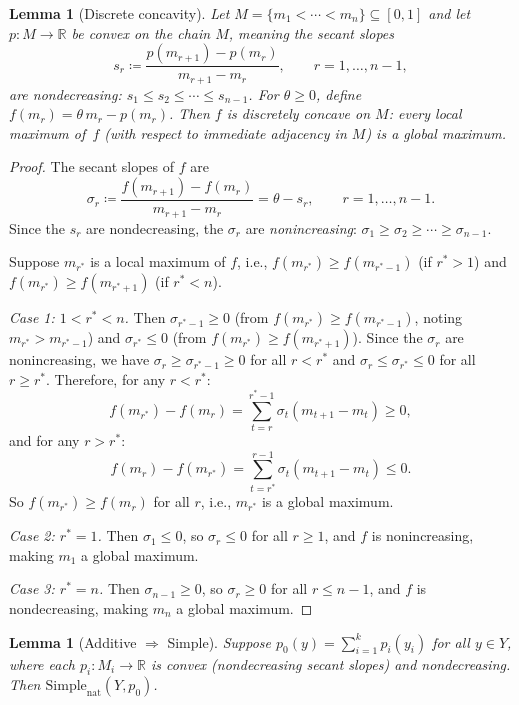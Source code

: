 \documentclass[11pt]{article}
\newtheorem{lemma}[theorem]{Lemma}
\newcommand{\R}{\mathbb{R}}
\newcommand{\Simplenat}{\mathrm{Simple}_{\mathrm{nat}}}
\begin{document}
\begin{lemma}[Discrete concavity]\label{lem:concavity}
Let $M = \{m_1 < \cdots < m_n\} \subseteq [0,1]$ and let $p\colon M \to \R$
be \emph{convex on the chain} $M$, meaning the secant slopes
\[
  s_r \coloneqq \frac{p(m_{r+1}) - p(m_r)}{m_{r+1} - m_r}, \qquad r = 1,\dots,n-1,
\]
are nondecreasing: $s_1 \leq s_2 \leq \cdots \leq s_{n-1}$.
For $\theta \geq 0$, define $f(m_r) = \theta\, m_r - p(m_r)$.
Then $f$ is \emph{discretely concave} on $M$: every local maximum of~$f$
(with respect to immediate adjacency in $M$) is a global maximum.
\end{lemma}

\begin{proof}
The secant slopes of $f$ are
\[
  \sigma_r \coloneqq \frac{f(m_{r+1}) - f(m_r)}{m_{r+1} - m_r} = \theta - s_r,
  \qquad r = 1,\dots,n-1.
\]
Since the $s_r$ are nondecreasing, the $\sigma_r$ are \emph{nonincreasing}:
$\sigma_1 \geq \sigma_2 \geq \cdots \geq \sigma_{n-1}$.

Suppose $m_{r^*}$ is a local maximum of $f$, i.e.,
$f(m_{r^*}) \geq f(m_{r^*-1})$ (if $r^* > 1$) and
$f(m_{r^*}) \geq f(m_{r^*+1})$ (if $r^* < n$).

\emph{Case 1: $1 < r^* < n$.}
Then $\sigma_{r^*-1} \geq 0$ (from $f(m_{r^*}) \geq f(m_{r^*-1})$, noting $m_{r^*} > m_{r^*-1}$)
and $\sigma_{r^*} \leq 0$ (from $f(m_{r^*}) \geq f(m_{r^*+1})$).
Since the $\sigma_r$ are nonincreasing, we have
$\sigma_r \geq \sigma_{r^*-1} \geq 0$ for all $r < r^*$
and $\sigma_r \leq \sigma_{r^*} \leq 0$ for all $r \geq r^*$.
Therefore, for any $r < r^*$:
\[
  f(m_{r^*}) - f(m_r) = \sum_{t=r}^{r^*-1} \sigma_t (m_{t+1} - m_t) \geq 0,
\]
and for any $r > r^*$:
\[
  f(m_r) - f(m_{r^*}) = \sum_{t=r^*}^{r-1} \sigma_t (m_{t+1} - m_t) \leq 0.
\]
So $f(m_{r^*}) \geq f(m_r)$ for all $r$, i.e., $m_{r^*}$ is a global maximum.

\emph{Case 2: $r^* = 1$.}
Then $\sigma_1 \leq 0$, so $\sigma_r \leq 0$ for all $r \geq 1$,
and $f$ is nonincreasing, making $m_1$ a global maximum.

\emph{Case 3: $r^* = n$.}
Then $\sigma_{n-1} \geq 0$, so $\sigma_r \geq 0$ for all $r \leq n-1$,
and $f$ is nondecreasing, making $m_n$ a global maximum.
\end{proof}

\begin{lemma}[Additive $\Longrightarrow$ Simple]\label{lem:easy}
Suppose $p_0(y) = \sum_{i=1}^k p_i(y_i)$ for all $y \in Y$,
where each $p_i\colon M_i \to \R$ is convex (nondecreasing secant slopes)
and nondecreasing.
Then $\Simplenat(Y, p_0)$.
\end{lemma}
\end{document}
